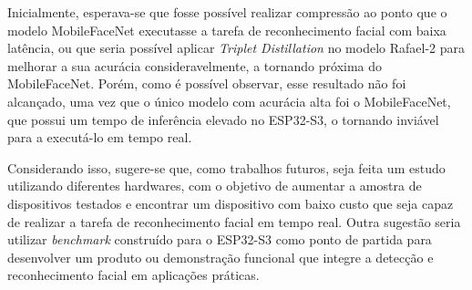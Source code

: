 Inicialmente, esperava-se que fosse possível realizar compressão ao ponto que o modelo MobileFaceNet executasse
a tarefa de reconhecimento facial com baixa latência, ou que seria possível aplicar
\textit{Triplet Distillation} no modelo Rafael-2 para melhorar a sua acurácia consideravelmente, a tornando
próxima do MobileFaceNet.
Porém, como é possível observar, esse resultado não foi alcançado, uma vez que o único modelo com acurácia alta
foi o MobileFaceNet, que possui um tempo de inferência elevado no ESP32-S3, o tornando inviável para a
executá-lo em tempo real.

Considerando isso, sugere-se que, como trabalhos futuros, seja feita um estudo utilizando diferentes hardwares,
com o objetivo de aumentar a amostra de dispositivos testados e encontrar um dispositivo com baixo custo que
seja capaz de realizar a tarefa de reconhecimento facial em tempo real. Outra sugestão seria utilizar
\textit{benchmark} construído para o ESP32-S3 como ponto de partida para desenvolver um produto ou demonstração
funcional que integre a detecção e reconhecimento facial em aplicações práticas.
